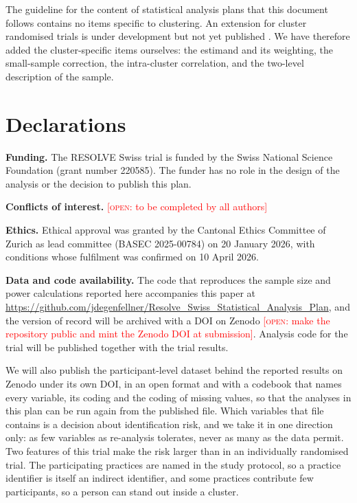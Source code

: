 \documentclass[11pt,a4paper]{article}
\newcommand{\open}[1]{\textcolor{red}{[\textsc{open}: #1]}}
\begin{document}
The guideline for the content of statistical analysis plans that this document
follows \citep{gamble2017} contains no items specific to clustering. An
extension for cluster randomised trials is under development but not yet
published \citep{hemming2025sap}. We have therefore added the cluster-specific
items ourselves: the estimand and its weighting, the small-sample correction,
the intra-cluster correlation, and the two-level description of the sample.

\section*{Declarations}

\textbf{Funding.} The RESOLVE Swiss trial is funded by the Swiss National
Science Foundation (grant number 220585). The funder has no role in the
design of the analysis or the decision to publish this plan.

\textbf{Conflicts of interest.} \open{to be completed by all authors}

\textbf{Ethics.} Ethical approval was granted by the Cantonal Ethics
Committee of Zurich as lead committee (BASEC 2025-00784) on 20 January 2026,
with conditions whose fulfilment was confirmed on 10 April 2026.

\textbf{Data and code availability.} The code that reproduces the sample size
and power calculations reported here accompanies this paper at
\url{https://github.com/jdegenfellner/Resolve_Swiss_Statistical_Analysis_Plan},
and the version of record will be archived with a DOI on Zenodo
\open{make the repository public and mint the Zenodo DOI at submission}.
Analysis code for the trial will be published together with the trial
results.

We will also publish the participant-level dataset behind the reported
results on Zenodo under its own DOI, in an open format and with a codebook
that names every variable, its coding and the coding of missing values, so
that the analyses in this plan can be run again from the published file.
Which variables that file contains is a decision about identification risk,
and we take it in one direction only: as few variables as re-analysis
tolerates, never as many as the data permit. Two features of this trial make
the risk larger than in an individually randomised trial. The participating
practices are named in the study protocol, so a practice identifier is
itself an indirect identifier, and some practices contribute few
participants, so a person can stand out inside a cluster.
\end{document}
